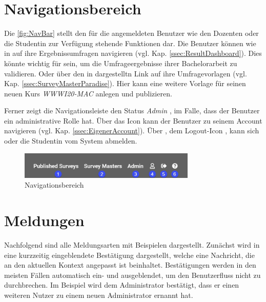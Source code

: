 \section{Navigationsbereich}
\label{ssec:NavBar}

Die \abb \vref{fig:NavBar} stellt den für die angemeldeten Benutzer wie \zb den Dozenten \dutzi oder die Studentin \ariane zur Verfügung stehende Funktionen dar. 
Die Benutzer können wie in \desOne auf ihre Ergebnissumfragen navigieren (vgl. Kap. \vref{ssec:ResultDashboard}). 
Dies könnte \ua wichtig für \ariane sein, um die Umfrageergebnisse ihrer Bachelorarbeit zu validieren. 
Oder über den in \desTwo dargestelltn Link auf ihre Umfragevorlagen (vgl. Kap. \vref{ssec:SurveyMasterParadise}). 
Hier kann \zb \dutzi eine weitere Vorlage für seinen neuen Kurs \emph{WWWI20-MAC} anlegen und publizieren. 
 
Ferner zeigt die Navigationsleiste den Status \emph{Admin} \desThree, im Falle, dass der Benutzer ein administrative Rolle hat. \newline
Über das Icon \faUser[regular]\xspace \desFour kann der Benutzer zu seinem Account navigieren (vgl. Kap. \vref{ssec:EigenerAccount}). \newline
Über \desFive, dem Logout-Icon \faSignOut*\xspace, kann sich \dutzi oder die Studentin \ariane vom System abmelden. 

\begin{figure}[H]
	\centering
	\includegraphics[width=0.75\textwidth, keepaspectratio]{img/guide/NavBar.png}
	\captionsetup{justification=centering, format=plain}
	\caption[Navigationsbereich]{Navigationsbereich \\\quelleScreenshot}
	\label{fig:NavBar}
\end{figure}

\section{Meldungen}
\label{ssec:Meldungen}

Nachfolgend sind alle Meldungsarten mit Beispielen dargestellt.
Zunächst wird in  eine kurzzeitig eingeblendete Bestätigung dargestellt, welche eine Nachricht, die an den aktuellen Kontext angepasst ist beinhaltet.
Bestätigungen werden in den meisten Fällen automatisch ein- und ausgeblendet, um den Benutzerfluss nicht zu durchbrechen.
Im Beispiel wird dem Administrator bestätigt, dass er einen weiteren Nutzer zu einem neuen Administrator ernannt hat.

